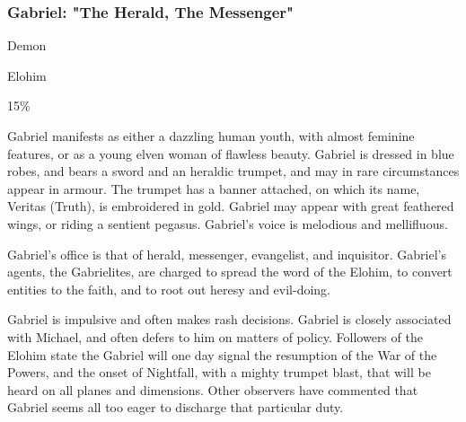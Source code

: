 \subsubsection{Gabriel: "The Herald, The Messenger"}

\begin{Description}
\item[Type] Demon
\item[Group] Elohim
\item[Response] 15\%
\item[Description] Gabriel manifests as either a dazzling human youth,
  with almost feminine features, or as a young elven woman of flawless
  beauty. Gabriel is dressed in blue robes, and bears a sword and an
  heraldic trumpet, and may in rare circumstances appear in armour.
  The trumpet has a banner attached, on which its name, Veritas
  (Truth), is embroidered in gold. Gabriel may appear with great
  feathered wings, or riding a sentient pegasus. Gabriel's voice is
  melodious and mellifluous.
  
\item[Sphere] Gabriel's office is that of herald, messenger, evangelist, and inquisitor.  Gabriel's agents, the Gabrielites, are charged to spread the word of the Elohim, to convert entities to the faith, and to root out heresy and evil-doing. 

\item[Personality] Gabriel is impulsive and often makes rash
  decisions.  Gabriel is closely associated with Michael, and often
  defers to him on matters of policy. Followers of the Elohim state
  the Gabriel will one day signal the resumption of the War of the
  Powers, and the onset of Nightfall, with a mighty trumpet blast,
  that will be heard on all planes and dimensions. Other observers
  have commented that Gabriel seems all too eager to discharge that
  particular duty.


\end{Description}

